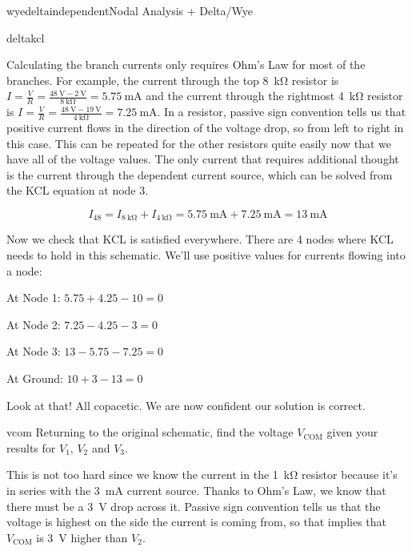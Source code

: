 \begin{mainquestion}{wyedeltaindependent}{Nodal Analysis + Delta/Wye}
\begin{partquestion}{deltakcl}
\begin{answer}
Calculating the branch currents only requires Ohm’s Law for most of the branches. For example, the current through the top \qty{8}{\kilo\ohm} resistor is
\( I = \frac{V}{R} = \frac{\qty{48}{\volt} - \qty{2}{\volt}}{\qty{8}{\kilo\ohm}} = \qty{5.75}{\milli\ampere} \) and the current through the rightmost \qty{4}{\kilo\ohm} resistor is \( I = \frac{V}{R} = \frac{\qty{48}{\volt} - \qty{19}{\volt}}{\qty{4}{\kilo\ohm}} = \qty{7.25}{\milli\ampere} \). In a resistor, passive sign convention tells us that positive current flows in the direction of the voltage drop, so from left to right in this case. This can be repeated for the other resistors quite easily now that we have all of the voltage values. The only current that requires additional thought is the current through the dependent current source, which can be solved from the KCL equation at node 3.

\[
I_{48} = I_{\qty{8}{\kilo\ohm}} + I_{\qty{4}{\kilo\ohm}} = \qty{5.75}{\milli\ampere} + \qty{7.25}{\milli\ampere} = \qty{13}{\milli\ampere}
\]

Now we check that KCL is satisfied everywhere. There are 4 nodes where KCL needs to hold in this schematic. We’ll use positive values for currents flowing into a node:

At Node 1: \( 5.75 + 4.25 - 10 = 0 \)

At Node 2: \( 7.25 - 4.25 - 3 = 0 \)

At Node 3: \( 13 - 5.75 - 7.25 = 0 \)

At Ground: \( 10 + 3 - 13 = 0 \)

Look at that! All copacetic. We are now confident our solution is correct.

\end{answer}
\end{partquestion}

\begin{partquestion}{vcom}
{Returning to the original schematic, find the voltage $V_{\text{COM}}$ given your results for $V_1$, $V_2$ and $V_3$.}
\begin{answer}
This is not too hard since we know the current in the \qty{1}{\kilo\ohm} resistor because it’s in series with the \qty{3}{\milli\ampere} current source. Thanks to Ohm’s Law, we know that there must be a \qty{3}{\volt} drop across it. Passive sign convention tells us that the voltage is highest on the side the current is coming from, so that implies that $V_{\mathrm{COM}}$ is \qty{3}{\volt} higher than $V_2$.


\end{answer}
\end{partquestion}
\end{mainquestion}
